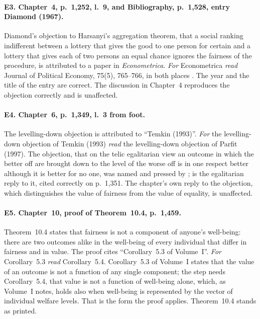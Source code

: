 \documentclass{situationist-preprint}
\begin{document}
\paragraph{E3. Chapter~4, p.~1,252, l.~9, and Bibliography, p.~1,528, entry Diamond (1967).} Diamond's objection to Harsanyi's aggregation theorem, that a social ranking indifferent between a lottery that gives the good to one person for certain and a lottery that gives each of two persons an equal chance ignores the fairness of the procedure, is attributed to a paper in \emph{Econometrica}. \textit{For} Econometrica \textit{read} Journal of Political Economy, 75(5), 765--766, in both places \citep{Diamond1967,Harsanyi1955}. The year and the title of the entry are correct. The discussion in Chapter~4 reproduces the objection correctly and is unaffected.

\paragraph{E4. Chapter~6, p.~1,349, l.~3 from foot.} The levelling-down objection is attributed to \enquote{Temkin (1993)}. \textit{For} the levelling-down objection of Temkin (1993) \textit{read} the levelling-down objection of Parfit (1997). The objection, that on the telic egalitarian view an outcome in which the better off are brought down to the level of the worse off is in one respect better although it is better for no one, was named and pressed by \citet{Parfit1997}; \citet{Temkin1993} is the egalitarian reply to it, cited correctly on p.~1,351. The chapter's own reply to the objection, which distinguishes the value of fairness from the value of equality, is unaffected.

\paragraph{E5. Chapter~10, proof of Theorem~10.4, p.~1,459.} Theorem~10.4 states that fairness is not a component of anyone's well-being: there are two outcomes alike in the well-being of every individual that differ in fairness and in value. The proof cites \enquote{Corollary~5.3 of Volume~I}. \textit{For} Corollary~5.3 \textit{read} Corollary~5.4. Corollary~5.3 of Volume~I states that the value of an outcome is not a function of any single component; the step needs Corollary~5.4, that value is not a function of well-being alone, which, as Volume~I notes, holds also when well-being is represented by the vector of individual welfare levels. That is the form the proof applies. Theorem~10.4 stands as printed.
\end{document}
